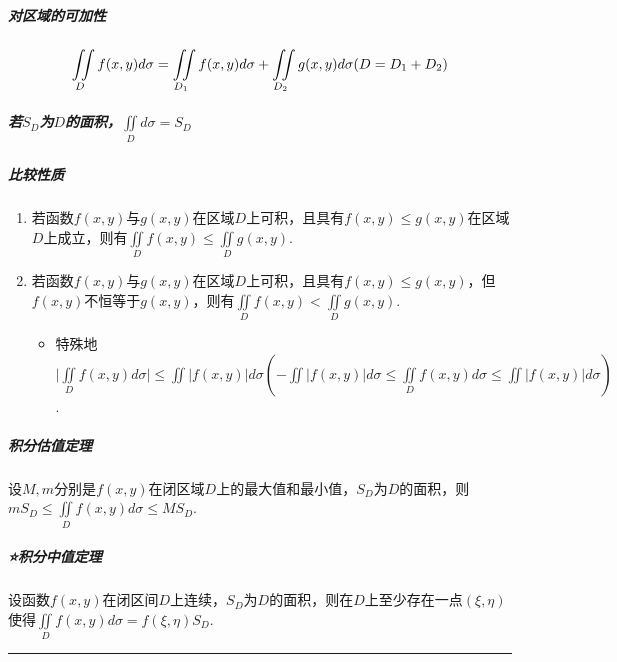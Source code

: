 \documentclass[
]{article}
\begin{document}
\hypertarget{ux5bf9ux533aux57dfux7684ux53efux52a0ux6027}{%
\subparagraph{对区域的可加性}\label{ux5bf9ux533aux57dfux7684ux53efux52a0ux6027}}

\[\iint\limits_Df(x,y)d\sigma = \iint\limits_{D_1}f(x,y)d\sigma + \iint\limits_{D_2}g(x,y)d\sigma \\(D=D_1+D_2)\]

\hypertarget{ux82e5uxasduxaux4e3auxaduxaux7684ux9762ux79efuxaux222cddux3c3sd}{%
\subparagraph{\texorpdfstring{若\(S_D\)为\(D\)的面积，\(\iint\limits_Dd\sigma=S_D\)}{若S\_D为D的面积，\textbackslash iint\textbackslash limits\_Dd\textbackslash sigma=S\_D}}\label{ux82e5uxasduxaux4e3auxaduxaux7684ux9762ux79efuxaux222cddux3c3sd}}

\hypertarget{ux6bd4ux8f83ux6027ux8d28}{%
\subparagraph{比较性质}\label{ux6bd4ux8f83ux6027ux8d28}}

\begin{enumerate}
\def\labelenumi{\arabic{enumi}.}
\item
  若函数\(f(x,y)\)与\(g(x,y)\)在区域\(D\)上可积，且具有\(f(x,y)\le g(x,y)\)在区域\(D\)上成立，则有\(\iint\limits_D f(x,y)\le \iint\limits_Dg(x,y)\).
\item
  若函数\(f(x,y)\)与\(g(x,y)\)在区域\(D\)上可积，且具有\(f(x,y)\le g(x,y)\)，但\(f(x,y)\)不恒等于\(g(x,y)\)，则有\(\iint\limits_D f(x,y) < \iint\limits_Dg(x,y)\).

  \begin{itemize}
  \item
    特殊地\(\vert \iint\limits_D f(x,y)d\sigma \vert \le \iint\limits\vert f(x,y) \vert d\sigma(-\iint\limits\vert f(x,y) \vert d\sigma\le \iint\limits_D f(x,y)d\sigma\le \iint\limits\vert f(x,y) \vert d\sigma)\).
  \end{itemize}
\end{enumerate}

\hypertarget{ux79efux5206ux4f30ux503cux5b9aux7406}{%
\subparagraph{积分估值定理}\label{ux79efux5206ux4f30ux503cux5b9aux7406}}

设\(M,m\)分别是\(f(x,y)\)在闭区域\(D\)上的最大值和最小值，\(S_D\)为\(D\)的面积，则\(mS_D\le\iint\limits_D f(x,y) d\sigma\le MS_D\).

\hypertarget{ux79efux5206ux4e2dux503cux5b9aux7406-2}{%
\subparagraph{⭐️积分中值定理}\label{ux79efux5206ux4e2dux503cux5b9aux7406-2}}

设函数\(f(x,y)\)在闭区间\(D\)上连续，\(S_D\)为\(D\)的面积，则在\(D\)上至少存在一点\((\xi,\eta)\)使得\(\iint\limits_Df(x,y)d\sigma=f(\xi,\eta)S_D\).

\begin{center}\rule{0.5\linewidth}{0.5pt}\end{center}
\end{document}

